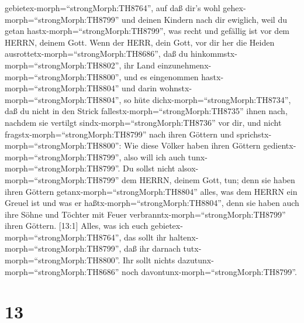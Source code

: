 gebietex-morph=``strongMorph:TH8764'', auf daß dir's wohl
gehex-morph=``strongMorph:TH8799'' und deinen Kindern nach dir ewiglich,
weil du getan hastx-morph=``strongMorph:TH8799'', was recht und gefällig
ist vor dem HERRN, deinem Gott.  Wenn der HERR, dein Gott,
vor dir her die Heiden ausrottetx-morph=``strongMorph:TH8686'', daß du
hinkommstx-morph=``strongMorph:TH8802'', ihr Land
einzunehmenx-morph=``strongMorph:TH8800'', und es eingenommen
hastx-morph=``strongMorph:TH8804'' und darin
wohnstx-morph=``strongMorph:TH8804'',  so hüte
dichx-morph=``strongMorph:TH8734'', daß du nicht in den Strick
fallestx-morph=``strongMorph:TH8735'' ihnen nach, nachdem sie vertilgt
sindx-morph=``strongMorph:TH8736'' vor dir, und nicht
fragstx-morph=``strongMorph:TH8799'' nach ihren Göttern und
sprichstx-morph=``strongMorph:TH8800'': Wie diese Völker haben ihren
Göttern gedientx-morph=``strongMorph:TH8799'', also will ich auch
tunx-morph=``strongMorph:TH8799''.  Du sollst nicht
alsox-morph=``strongMorph:TH8799'' dem HERRN, deinem Gott, tun; denn sie
haben ihren Göttern getanx-morph=``strongMorph:TH8804'' alles, was dem
HERRN ein Greuel ist und was er haßtx-morph=``strongMorph:TH8804'', denn
sie haben auch ihre Söhne und Töchter mit Feuer
verbranntx-morph=``strongMorph:TH8799'' ihren Göttern. 
{[}13:1{]} Alles, was ich euch gebietex-morph=``strongMorph:TH8764'',
das sollt ihr haltenx-morph=``strongMorph:TH8799'', daß ihr darnach
tutx-morph=``strongMorph:TH8800''. Ihr sollt nichts
dazutunx-morph=``strongMorph:TH8686'' noch
davontunx-morph=``strongMorph:TH8799''.

\hypertarget{section-12}{%
\section{13}\label{section-12}}

